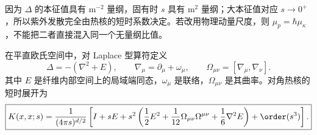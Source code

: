 因为 \(\Delta\) 的本征值具有 \(\mathrm{m^{-2}}\) 量纲，固有时 \(s\) 具有 \(\mathrm{m^2}\) 量纲；大本征值对应 \(s\to0^+\)，所以紫外发散完全由热核的短时系数决定。若改用物理动量尺度，则 \(\mu_p=\hbar\mu_\kappa\)，不能把二者直接混入同一个无量纲比值。

在平直欧氏空间中，对 Laplace 型算符定义
\begin{equation}
 \boxed{
 \Delta=-\left(\nabla^2+E\right),
 \qquad
 \nabla_\mu=\partial_\mu+\omega_\mu,
 \qquad
 \Omega_{\mu\nu}=[\nabla_\mu,\nabla_\nu].}
 \label{eq:laplace-type-operator-dp11}
\end{equation}
其中 \(E\) 是纤维内部空间上的局域端同态，\(\omega_\mu\) 是联络，\(\Omega_{\mu\nu}\) 是其曲率。对角热核的短时展开为
\begin{equation}
 \boxed{
 K(x,x;s)
 =\frac1{(4\pi s)^{d/2}}
 \left[
 I+sE+s^2\left(
 \frac12E^2+\frac1{12}\Omega_{\mu\nu}\Omega^{\mu\nu}
 +\frac16\nabla^2E
 \right)+\order(s^3)
 \right].}
 \label{eq:heat-kernel-a4-flat-dp11}
\end{equation}

